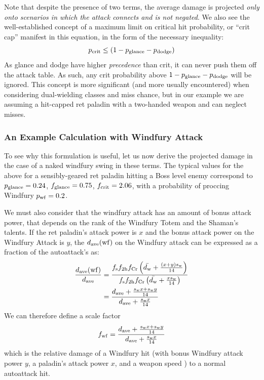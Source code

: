 \documentclass[letterpaper,11pt]{article}
\begin{document}
	Note that despite the presence of two \pdodge terms, the average damage is projected \emph{only onto scenarios in which the attack connects and is not negated}.
	We also see the well-established concept of a maximum limit on critical hit probability, or ``crit cap'' manifest in this equation, in the form of the necessary inequality:
	\begin{equation}
			p_{\mathrm{crit}}  \leq (1-p_{\mathrm{glance}}  - p_{\mathrm{dodge}} )
	\end{equation}
	As glance and dodge have higher \emph{precedence} than crit, it can never push them off the attack table.
	As such, any crit probability above $1 - p_{\mathrm{glance}}  - p_{\mathrm{dodge}} $ will be ignored.
	This concept is more significant (and more usually encountered) when considering dual-wielding classes and miss chance, but in our example we are assuming a hit-capped ret paladin with a two-handed weapon and can neglect misses.
	
	\subsubsection{An Example Calculation with Windfury Attack}
	To see why this formulation is useful, let us now derive the projected damage in the case of a naked windfury swing in these terms.
	The typical values for the above for a sensibly-geared ret paladin hitting a Boss level enemy correspond to $p_{\mathrm{glance}}  = 0.24$, $f_{\mathrm{glance}}  = 0.75$, $f_{\mathrm{crit}}  = 2.06$, with a probability of proccing Windfury $p_{\mathrm{wf}}  = 0.2$.
	
	We must also consider that the windfury attack has an amount of bonus attack power, that depends on the rank of the Windfury Totem and the Shaman's talents.
	If the ret paladin's attack power is $x$ and the bonus attack power on the Windfury Attack is $y$, the $d_{\mathrm{ave}} (\mathrm{wf})$ on the Windfury attack can be expressed as a fraction of the autoattack's \dave as:
	\begin{equation*}
		\begin{aligned}
			\frac{d_{\mathrm{ave}} (\mathrm{wf})}{d_{\mathrm{ave}} } &= \frac{f_{\mathrm{s}}  f_{\mathrm{2h}}  f_{\mathrm{Cr}}  \left( \bar{d_\mathrm{w} } + \frac{(x+y)s_\mathrm{w} }{14} \right)}{f_{\mathrm{s}}  f_{\mathrm{2h}}  f_{\mathrm{Cr}}  \left( \bar{d_\mathrm{w} } + \frac{xs_\mathrm{w} }{14} \right)} \\
			&= \frac{d_{\mathrm{ave}}  + \frac{s_\mathrm{w}  x + s_\mathrm{w}  y}{14}}{d_{\mathrm{ave}}  + \frac{s_\mathrm{w}  x}{14}}
		\end{aligned}
	\end{equation*}
	We can therefore define a scale factor
	\begin{equation}
		f_{\mathrm{wf}}  = \frac{d_{\mathrm{ave}}  + \frac{s_\mathrm{w}  x + s_\mathrm{w}  y}{14}}{d_{\mathrm{ave}}  + \frac{s_\mathrm{w}  x}{14}}
	\end{equation}
	which is the relative damage of a Windfury hit (with bonus Windfury attack power $y$, a paladin's attack power $x$, and a weapon speed \ws) to a normal autoattack hit.
	
\end{document}
